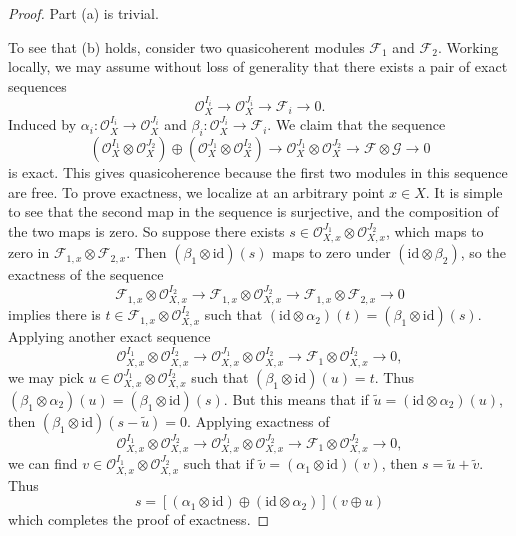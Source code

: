 \begin{proof}
    Part (a) is trivial.

    To see that (b) holds, consider two quasicoherent modules $\mathcal{F}_1$ and $\mathcal{F}_2$. Working locally, we may assume without loss of generality that there exists a pair of exact sequences
    \[ \mathcal{O}_X^{I_i} \to \mathcal{O}_X^{J_i} \to \mathcal{F}_i \to 0. \]
    Induced by $\alpha_i: \mathcal{O}_X^{I_i} \to \mathcal{O}_X^{J_i}$ and $\beta_i: \mathcal{O}_X^{J_i} \to \mathcal{F}_i$. We claim that the sequence
    \[ (\mathcal{O}_X^{I_1} \otimes \mathcal{O}_X^{J_2}) \oplus (\mathcal{O}_X^{J_1} \otimes \mathcal{O}_X^{I_2}) \to \mathcal{O}_X^{J_1} \otimes \mathcal{O}_X^{J_2} \to \mathcal{F} \otimes \mathcal{G} \to 0 \]
    is exact. This gives quasicoherence because the first two modules in this sequence are free. To prove exactness, we localize at an arbitrary point $x \in X$. It is simple to see that the second map in the sequence is surjective, and the composition of the two maps is zero. So suppose there exists $s \in \mathcal{O}_{X,x}^{J_1} \otimes \mathcal{O}_{X,x}^{J_2}$, which maps to zero in $\mathcal{F}_{1,x} \otimes \mathcal{F}_{2,x}$. Then $(\beta_1 \otimes \text{id})(s)$ maps to zero under $(\text{id} \otimes \beta_2)$, so the exactness of the sequence
    \[ \mathcal{F}_{1,x} \otimes \mathcal{O}_{X,x}^{I_2} \to \mathcal{F}_{1,x} \otimes \mathcal{O}_{X,x}^{J_2} \to \mathcal{F}_{1,x} \otimes \mathcal{F}_{2,x} \to 0 \]
    implies there is $t \in \mathcal{F}_{1,x} \otimes \mathcal{O}_{X,x}^{I_2}$ such that $(\text{id} \otimes \alpha_2)(t) = (\beta_1 \otimes \text{id})(s)$. Applying another exact sequence
    \[ \mathcal{O}_{X,x}^{I_1} \otimes \mathcal{O}_{X,x}^{I_2} \to \mathcal{O}_{X,x}^{J_1} \otimes \mathcal{O}_{X,x}^{I_2} \to \mathcal{F}_1 \otimes \mathcal{O}_{X,x}^{I_2} \to 0, \]
    we may pick $u \in \mathcal{O}_{X,x}^{J_1} \otimes \mathcal{O}_{X,x}^{I_2}$ such that $(\beta_1 \otimes \text{id})(u) = t$. Thus $(\beta_1 \otimes \alpha_2)(u) = (\beta_1 \otimes \text{id})(s)$. But this means that if $\tilde{u} = (\text{id} \otimes \alpha_2)(u)$, then $(\beta_1 \otimes \text{id})(s - \tilde{u}) = 0$. Applying exactness of
    \[ \mathcal{O}_{X,x}^{I_1} \otimes \mathcal{O}_{X,x}^{J_2} \to \mathcal{O}_{X,x}^{J_1} \otimes \mathcal{O}_{X,x}^{J_2} \to \mathcal{F}_1 \otimes \mathcal{O}_{X,x}^{J_2} \to 0, \]
    we can find $v \in \mathcal{O}_{X,x}^{I_1} \otimes \mathcal{O}_{X,x}^{J_2}$ such that if $\tilde{v} = (\alpha_1 \otimes \text{id})(v)$, then $s = \tilde{u} + \tilde{v}$. Thus
    \[ s = [(\alpha_1 \otimes \text{id}) \oplus (\text{id} \otimes \alpha_2)](v \oplus u) \]
    which completes the proof of exactness.


\end{proof}

